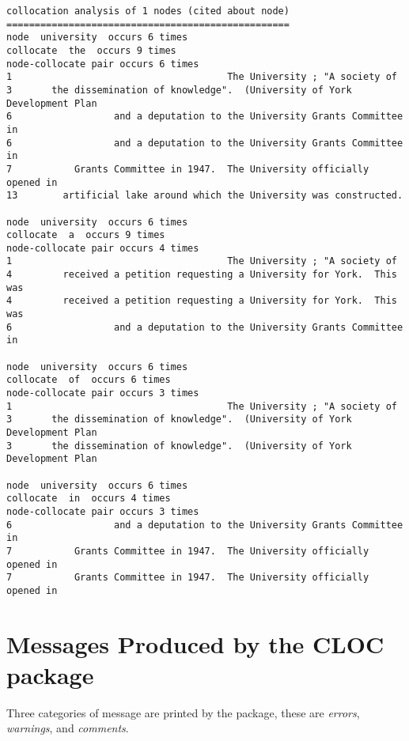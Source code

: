 \begin{verbatim}
collocation analysis of 1 nodes (cited about node)
==================================================
node  university  occurs 6 times
collocate  the  occurs 9 times
node-collocate pair occurs 6 times
1                                      The University ; "A society of 
3       the dissemination of knowledge".  (University of York Development Plan
6                  and a deputation to the University Grants Committee in
6                  and a deputation to the University Grants Committee in
7           Grants Committee in 1947.  The University officially opened in
13        artificial lake around which the University was constructed. 

node  university  occurs 6 times
collocate  a  occurs 9 times
node-collocate pair occurs 4 times
1                                      The University ; "A society of 
4         received a petition requesting a University for York.  This was 
4         received a petition requesting a University for York.  This was 
6                  and a deputation to the University Grants Committee in

node  university  occurs 6 times
collocate  of  occurs 6 times
node-collocate pair occurs 3 times
1                                      The University ; "A society of 
3       the dissemination of knowledge".  (University of York Development Plan
3       the dissemination of knowledge".  (University of York Development Plan

node  university  occurs 6 times
collocate  in  occurs 4 times
node-collocate pair occurs 3 times
6                  and a deputation to the University Grants Committee in
7           Grants Committee in 1947.  The University officially opened in
7           Grants Committee in 1947.  The University officially opened in
\end{verbatim}

\newpage
\section{Messages Produced by the CLOC package}
Three categories of message are printed by the package, these are {\em errors},
{\em warnings}, and {\em comments}.

